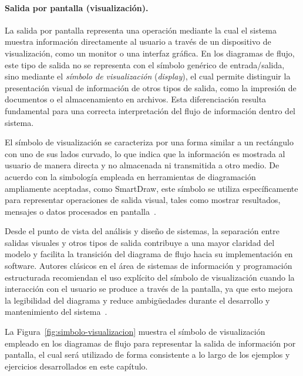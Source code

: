\documentclass[12pt,twoside]{book}
\begin{document}
						
						\paragraph{Salida por pantalla (visualización).}
						La salida por pantalla representa una operación mediante la cual el sistema muestra información directamente al usuario a través de un dispositivo de visualización, como un monitor o una interfaz gráfica. En los diagramas de flujo, este tipo de salida no se representa con el símbolo genérico de entrada/salida, sino mediante el \textit{símbolo de visualización} (\textit{display}), el cual permite distinguir la presentación visual de información de otros tipos de salida, como la impresión de documentos o el almacenamiento en archivos. Esta diferenciación resulta fundamental para una correcta interpretación del flujo de información dentro del sistema.
						
						El símbolo de visualización se caracteriza por una forma similar a un rectángulo con uno de sus lados curvado, lo que indica que la información es mostrada al usuario de manera directa y no almacenada ni transmitida a otro medio. De acuerdo con la simbología empleada en herramientas de diagramación ampliamente aceptadas, como SmartDraw, este símbolo se utiliza específicamente para representar operaciones de salida visual, tales como mostrar resultados, mensajes o datos procesados en pantalla~\cite{SmartDrawFlowchartSymbols}.
						
						Desde el punto de vista del análisis y diseño de sistemas, la separación entre salidas visuales y otros tipos de salida contribuye a una mayor claridad del modelo y facilita la transición del diagrama de flujo hacia su implementación en software. Autores clásicos en el área de sistemas de información y programación estructurada recomiendan el uso explícito del símbolo de visualización cuando la interacción con el usuario se produce a través de la pantalla, ya que esto mejora la legibilidad del diagrama y reduce ambigüedades durante el desarrollo y mantenimiento del sistema~\cite{Kendall2014Systems,Manzano2017Programacion}.
						
						La Figura~\ref{fig:simbolo-visualizacion} muestra el símbolo de visualización empleado en los diagramas de flujo para representar la salida de información por pantalla, el cual será utilizado de forma consistente a lo largo de los ejemplos y ejercicios desarrollados en este capítulo.
						
\end{document}
